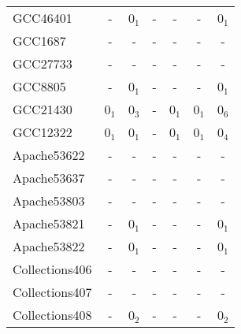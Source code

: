 \begin{table}
\begin{tabular}{lcccccc}
   \midrule
   GCC46401              &   -                  & 0$_1$                       & -                       & -                     &   -             & 0$_1$\\
   GCC1687               &   -                  & -                           & -                       & -                     &   -             & -\\
   GCC27733              &   -                  & -                           & -                       & -                     &   -             & - \\
   GCC8805               &   -                  & 0$_1$                       & -                       & -                     &   -             & 0$_1$\\
   GCC21430              &   0$_1$              & 0$_3$                       & -                       & 0$_1$                 &   0$_1$         & 0$_6$\\
   GCC12322              &   0$_1$              & 0$_1$                       & -                       & 0$_1$                 &   0$_1$         & 0$_4$\\
\midrule
\midrule
Apache53622		 &   -                  & -                           & -                       & -                     &   -             & -\\	  	
Apache53637		 &   -                  & -                           & -                       & -                     &   -             & -\\
Apache53803		 &   -                  & -                           & -                       & -                     &   -             & -\\
Apache53821	         &   -                  & 0$_1$                       & -                       & -                     &   -             &0$_1$\\
Apache53822	         &   -                  & 0$_1$                       & -                       & -                     &   -             &0$_1$\\
\midrule                 
Collections406           &   -                  & -                           & -                       & -                     &   -             & -\\  	
Collections407           &   -                  & -                           & -                       & -                     &   -             & -\\  	
Collections408           &   -                  & 0$_2$                       & -                       & -                     &   -             &0$_2$\\

\end{tabular}
\end{table}
